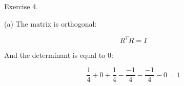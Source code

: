 \documentclass{article}
\begin{document}
Exercise 4.

(a) The matrix is orthogonal:

\begin{equation}
  {R}^{T}R = I
\end{equation}

And the determinant is equal to 0: 

\begin{equation}
  \frac{1}{4} + 0 + \frac{1}{4} - \frac{-1}{4} - \frac{-1}{4} - 0 = 1 
\end{equation}
\end{document}
